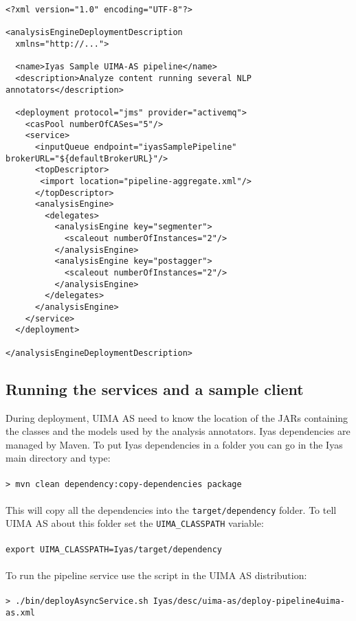 \documentclass{wileysev}
\begin{document}
\lstset{language=XML}
\begin{lstlisting}
<?xml version="1.0" encoding="UTF-8"?>

<analysisEngineDeploymentDescription 
  xmlns="http://...">
  
  <name>Iyas Sample UIMA-AS pipeline</name>
  <description>Analyze content running several NLP annotators</description>
  
  <deployment protocol="jms" provider="activemq">
	<casPool numberOfCASes="5"/>
    <service>
      <inputQueue endpoint="iyasSamplePipeline" brokerURL="${defaultBrokerURL}"/>
      <topDescriptor>
       <import location="pipeline-aggregate.xml"/> 
      </topDescriptor>
      <analysisEngine>
        <delegates>
          <analysisEngine key="segmenter">
            <scaleout numberOfInstances="2"/>              
          </analysisEngine>
          <analysisEngine key="postagger">
            <scaleout numberOfInstances="2"/>              
          </analysisEngine>
        </delegates>
      </analysisEngine>
    </service>
  </deployment>

</analysisEngineDeploymentDescription>
\end{lstlisting}

\subsection{Running the services and a sample client}

During deployment, UIMA AS need to know the location of the JARs containing the classes and the models used by the analysis annotators. Iyas dependencies are managed by Maven. To put Iyas dependencies in a folder you can go in the Iyas main directory and type:
\\\\
\texttt{> mvn clean dependency:copy-dependencies package}
\\\\
This will copy all the dependencies into the \texttt{target/dependency} folder. To tell UIMA AS about this folder set the \texttt{UIMA\_CLASSPATH} variable:
\\\\
\texttt{export UIMA\_CLASSPATH=Iyas/target/dependency}
\\\\
To run the pipeline service use the script in the UIMA AS distribution:
\\\\
\texttt{> ./bin/deployAsyncService.sh Iyas/desc/uima-as/deploy-pipeline4uima-as.xml}
\end{document}
